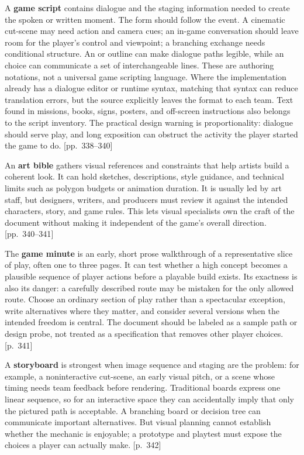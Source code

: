 A \textbf{game script} contains dialogue and the staging information needed to create the spoken or written moment. The form should follow the event. A cinematic cut-scene may need action and camera cues; an in-game conversation should leave room for the player's control and viewpoint; a branching exchange needs conditional structure. An  or  outline can make dialogue paths legible, while an  choice can communicate a set of interchangeable lines. These are authoring notations, not a universal game scripting language. Where the implementation already has a dialogue editor or runtime syntax, matching that syntax can reduce translation errors, but the source explicitly leaves the format to each team. Text found in missions, books, signs, posters, and off-screen instructions also belongs to the script inventory. The practical design warning is proportionality: dialogue should serve play, and long exposition can obstruct the activity the player started the game to do. {[}pp.~338--340{]}

An \textbf{art bible} gathers visual references and constraints that help artists build a coherent look. It can hold sketches, descriptions, style guidance, and technical limits such as polygon budgets or animation duration. It is usually led by art staff, but designers, writers, and producers must review it against the intended characters, story, and game rules. This lets visual specialists own the craft of the document without making it independent of the game's overall direction. {[}pp.~340--341{]}

The \textbf{game minute} is an early, short prose walkthrough of a representative slice of play, often one to three pages. It can test whether a high concept becomes a plausible sequence of player actions before a playable build exists. Its exactness is also its danger: a carefully described route may be mistaken for the only allowed route. Choose an ordinary section of play rather than a spectacular exception, write alternatives where they matter, and consider several versions when the intended freedom is central. The document should be labeled as a sample path or design probe, not treated as a specification that removes other player choices. {[}p.~341{]}

A \textbf{storyboard} is strongest when image sequence and staging are the problem: for example, a noninteractive cut-scene, an early visual pitch, or a scene whose timing needs team feedback before rendering. Traditional boards express one linear sequence, so for an interactive space they can accidentally imply that only the pictured path is acceptable. A branching board or decision tree can communicate important alternatives. But visual planning cannot establish whether the mechanic is enjoyable; a prototype and playtest must expose the choices a player can actually make. {[}p.~342{]}


